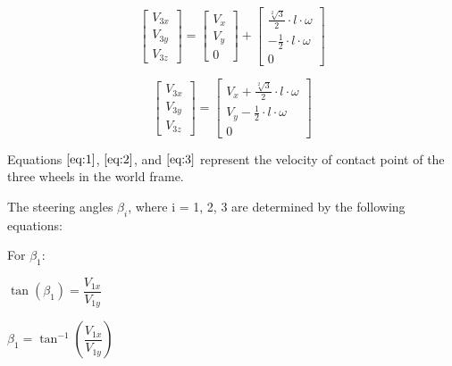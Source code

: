 \documentclass[answers]{exam}
\begin{document}
\begin{questions}
\begin{parts}
\begin{solution}
            \begin{equation*}
                \begin{bmatrix}
                    V_{3x} \\
                    V_{3y} \\
                    V_{3z}
                \end{bmatrix}
                = \begin{bmatrix}
                    V_x \\
                    V_y \\
                    0
                \end{bmatrix}
                + \begin{bmatrix}
                    \frac{\sqrt[2]{3}}{2} \cdot l \cdot \omega \\
                    - \frac{1}{2} \cdot l \cdot \omega         \\
                    0
                \end{bmatrix}
            \end{equation*}

            \begin{equation} \label{eq:3}
                \begin{bmatrix}
                    V_{3x} \\
                    V_{3y} \\
                    V_{3z}
                \end{bmatrix}
                = \begin{bmatrix}
                    V_x + \frac{\sqrt[2]{3}}{2} \cdot l \cdot \omega \\
                    V_y - \frac{1}{2} \cdot l \cdot \omega           \\
                    0
                \end{bmatrix}
            \end{equation}

            Equations $\eqref{eq:1}$, $\eqref{eq:2}$, and $\eqref{eq:3}$ represent the
            velocity of contact point of the three wheels in the world frame.

            The steering angles $\beta_i$, where i = 1, 2, 3 are determined by the
            following equations:

            For $\beta_1$:

            $\tan(\beta_1) = \dfrac{V_{1x}}{V_{1y}}$

            $\beta_1 = \tan^{-1}(\dfrac{V_{1x}}{V_{1y}})$


\end{solution}
\end{parts}
\end{questions}
\end{document}
